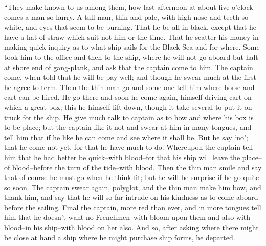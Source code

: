 \documentclass[12pt,openright]{book}
\begin{document}
“They make known to us among them, how last afternoon at about five o’clock comes a man so hurry. A tall man, thin and pale, with high nose and teeth so white, and eyes that seem to be burning. That he be all in black, except that he have a hat of straw which suit not him or the time. That he scatter his money in making quick inquiry as to what ship sails for the Black Sea and for where. Some took him to the office and then to the ship, where he will not go aboard but halt at shore end of gang-plank, and ask that the captain come to him. The captain come, when told that he will be pay well; and though he swear much at the first he agree to term. Then the thin man go and some one tell him where horse and cart can be hired. He go there and soon he come again, himself driving cart on which a great box; this he himself lift down, though it take several to put it on truck for the ship. He give much talk to captain as to how and where his box is to be place; but the captain like it not and swear at him in many tongues, and tell him that if he like he can come and see where it shall be. But he say ‘no’; that he come not yet, for that he have much to do. Whereupon the captain tell him that he had better be quick–with blood–for that his ship will leave the place–of blood–before the turn of the tide–with blood. Then the thin man smile and say that of course he must go when he think fit; but he will be surprise if he go quite so soon. The captain swear again, polyglot, and the thin man make him bow, and thank him, and say that he will so far intrude on his kindness as to come aboard before the sailing. Final the captain, more red than ever, and in more tongues tell him that he doesn’t want no Frenchmen–with bloom upon them and also with blood–in his ship–with blood on her also. And so, after asking where there might be close at hand a ship where he might purchase ship forms, he departed.
\end{document}
